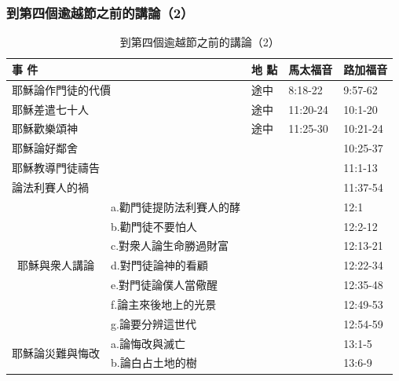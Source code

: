 \subsubsection{到第四個逾越節之前的講論（2）}
\begin{table}[htbp]
  \centering
    \begin{tabular}{|p{6.215em}|p{12.215em}|l|l|p{4.215em}|}
    \toprule
     \multicolumn{2}{|p{18.1em}|}{事 件} & \multicolumn{1}{p{2.3em}|}{地 點} & \multicolumn{1}{p{4.0em}|}{馬太福音} &  \multicolumn{1}{p{4.em}|}{路加福音}  \\
    \midrule
    \multicolumn{2}{|p{10.43em}|}{耶穌論作門徒的代價} & \multicolumn{1}{p{2.215em}|}{途中} & \multicolumn{1}{p{4.215em}|}{8:18-22} & 9:57-62 \\
    \midrule
    \multicolumn{2}{|p{8.43em}|}{耶穌差遣七十人} & \multicolumn{1}{p{2.215em}|}{途中} & \multicolumn{1}{p{4.215em}|}{11:20-24} & 10:1-20 \\
    \midrule
    \multicolumn{2}{|p{8.43em}|}{耶穌歡樂頌神} & \multicolumn{1}{p{2.215em}|}{途中} & \multicolumn{1}{p{4.215em}|}{11:25-30} & 10:21-24 \\
    \midrule
    \multicolumn{2}{|p{8.43em}|}{耶穌論好鄰舍} &       &       & 10:25-37 \\
    \midrule
    \multicolumn{2}{|p{8.43em}|}{耶穌教導門徒禱告} &       &       & 11:1-13 \\
    \midrule
    \multicolumn{2}{|p{8.43em}|}{論法利賽人的禍} &       &       & 11:37-54 \\
    \midrule
    \multicolumn{1}{|c|}{\multirow{7}{*}{\parbox{0.09\textwidth}{耶穌與衆人講論}}} & a.勸門徒提防法利賽人的酵 &       &       & \multicolumn{1}{l|}{12:1} \\
\cmidrule{2-5}          & b.勸門徒不要怕人 &       &       & 12:2-12 \\
\cmidrule{2-5}          & c.對衆人論生命勝過財富 &       &       & 12:13-21 \\
\cmidrule{2-5}          & d.對門徒論神的看顧 &       &       & 12:22-34 \\
\cmidrule{2-5}          & e.對門徒論僕人當儆醒 &       &       & 12:35-48 \\
\cmidrule{2-5}          & f.論主來後地上的光景 &       &       & 12:49-53 \\
\cmidrule{2-5}          & g.論要分辨這世代 &       &       & 12:54-59 \\
    \midrule
    \multicolumn{1}{|c|}{\multirow{2}{*}{\parbox{0.09\textwidth}{耶穌論災難與悔改}}} & a.論悔改與滅亡 &       &       & 13:1-5 \\
\cmidrule{2-5}          & b.論白占土地的樹 &       &       & 13:6-9 \\
    \bottomrule
    \end{tabular}%
      \caption{到第四個逾越節之前的講論（2）}
  \label{tab:addlabel}%
\end{table}%

